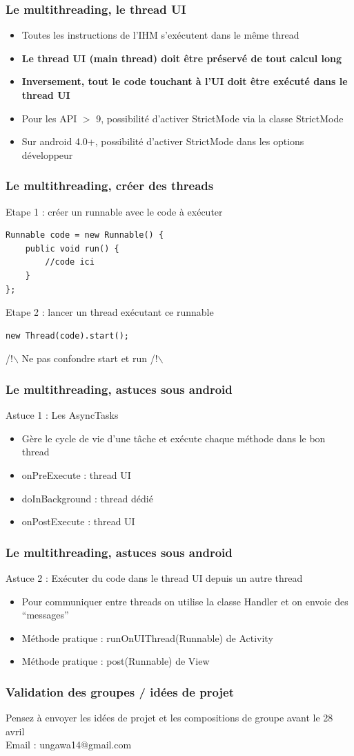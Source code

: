 \documentclass{beamer}
\begin{document}
\begin{frame}[fragile] 
\frametitle{Le multithreading, le thread UI}
\begin{itemize}
  \item Toutes les instructions de l'IHM s'exécutent dans le même thread
  \item \textbf{Le thread UI (main thread) doit être préservé de tout calcul
  long}
  \item \textbf{Inversement, tout le code touchant à l'UI doit être exécuté dans le thread UI}
  \item Pour les API $>$ 9, possibilité d'activer StrictMode via la classe StrictMode
  \item Sur android 4.0+, possibilité d'activer StrictMode dans les options développeur
\end{itemize}
\end{frame}
\begin{frame}[fragile] 
\frametitle{Le multithreading, créer des threads}
Etape 1 : créer un runnable avec le code à exécuter
\begin{lstlisting}
Runnable code = new Runnable() {
    public void run() {
        //code ici
    }
};
\end{lstlisting}
Etape 2 : lancer un thread exécutant ce runnable
\begin{lstlisting}
new Thread(code).start();
\end{lstlisting}
/!$\backslash$ Ne pas confondre start et run /!$\backslash$
\end{frame}
\begin{frame}[fragile] 
\frametitle{Le multithreading, astuces sous android}
Astuce 1 : Les AsyncTasks
\begin{itemize}
  \item Gère le cycle de vie d'une tâche et exécute chaque méthode dans le bon thread
  \item onPreExecute : thread UI
  \item doInBackground : thread dédié
  \item onPostExecute : thread UI
\end{itemize}
\end{frame}
\begin{frame}[fragile] 
\frametitle{Le multithreading, astuces sous android}
Astuce 2 : Exécuter du code dans le thread UI depuis un autre thread
\begin{itemize}
  \item Pour communiquer entre threads on utilise la classe Handler et on envoie
  des ``messages''
  \item Méthode pratique : runOnUIThread(Runnable) de Activity
  \item Méthode pratique : post(Runnable) de View
\end{itemize}
\end{frame}
\begin{frame}[fragile] 
\frametitle{Validation des groupes / idées de projet}
Pensez à envoyer les idées de projet et les compositions de groupe avant le 28
avril\\
Email : ungawa14@gmail.com
\end{frame}
\end{document}
